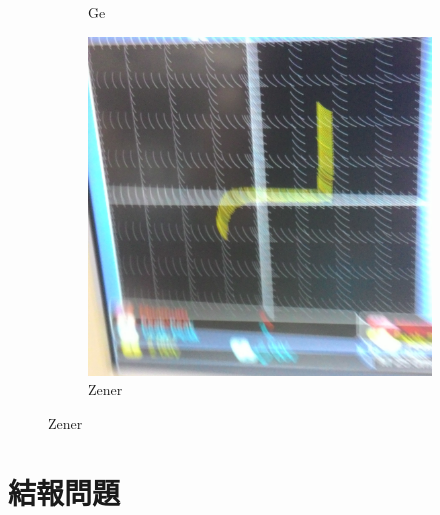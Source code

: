 \documentclass[12pt, a4paper]{article}
\begin{document}
\begin{figure}[H]
\begin{subfigure}[b]{0.5\textwidth}
    \caption{Ge}
  \end{subfigure}
  \begin{subfigure}[b]{0.5\textwidth}
    \includegraphics[width=1\textwidth]{img/P6.jpg}
    \caption{Zener}
  \end{subfigure}
\end{figure}


\section{結報問題}
\end{document}
